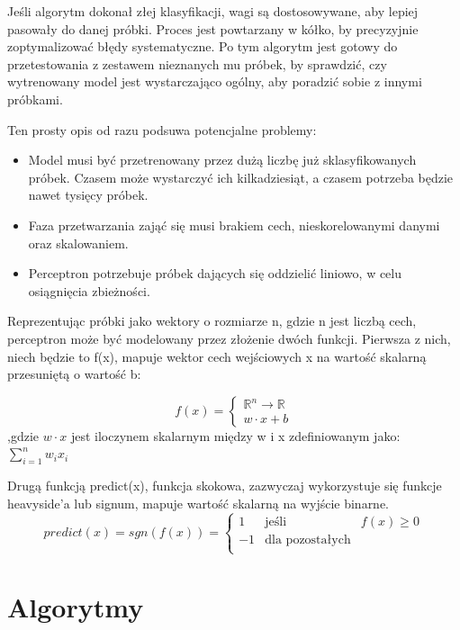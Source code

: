 \documentclass[12pt,a4paper]{article}
\begin{document}
            Jeśli algorytm dokonał złej klasyfikacji, wagi są dostosowywane, aby lepiej pasowały do danej próbki. Proces jest powtarzany w kółko, by precyzyjnie zoptymalizować błędy systematyczne. Po tym algorytm jest gotowy do przetestowania z zestawem nieznanych mu próbek, by sprawdzić, czy wytrenowany model jest wystarczająco ogólny, aby poradzić sobie z innymi próbkami.


            Ten prosty opis od razu podsuwa potencjalne problemy:
            \begin{itemize}
                \item Model musi być przetrenowany przez dużą liczbę już sklasyfikowanych próbek. Czasem może wystarczyć ich kilkadziesiąt, a czasem potrzeba będzie nawet tysięcy próbek.
                \item Faza przetwarzania zająć się musi brakiem cech, nieskorelowanymi  danymi oraz skalowaniem.
                \item Perceptron potrzebuje próbek dających się oddzielić liniowo, w celu osiągnięcia zbieżności.
            \end{itemize}{}
            Reprezentując próbki jako wektory o rozmiarze n, gdzie n jest liczbą cech, perceptron może być modelowany przez złożenie dwóch funkcji. Pierwsza z nich, niech będzie to f(x), mapuje wektor cech wejściowych x na wartość skalarną przesuniętą o wartość b:
	    
	        $$
	        f(x)=\left\{
	        \begin{array}{ccc}
	        \mathbb{R}^{n} \rightarrow \mathbb{R}  \\
	        w  \cdot  x + b
	        \end{array} 
	        \right.$$
	        ,gdzie  $w  \cdot  x$ jest iloczynem skalarnym między w i x zdefiniowanym jako: $\sum_{i=1}^{n} w_i x_i $
	
	        Drugą funkcją predict(x), funkcja skokowa, zazwyczaj wykorzystuje się funkcje heavyside’a lub signum, mapuje wartość skalarną na wyjście binarne.
	        $$
	        predict(x) = sgn(f(x))=\left\{
        	\begin{array}{ccc}
	            1 & \mbox{jeśli} & f(x)\geq0\\
	            -1 & \mbox{dla pozostałych}\\
	        \end{array}
	        \right.$$
	
	
	\section{Algorytmy}
\end{document}
